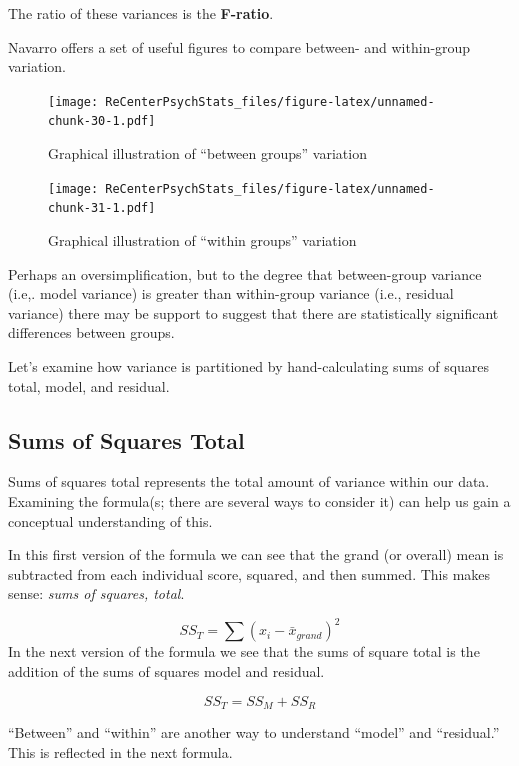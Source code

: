 \documentclass[
  english,
]{book}
\begin{document}
The ratio of these variances is the \textbf{F-ratio}.

Navarro \citeyearpar{navarro_book_2020} offers a set of useful figures to compare between- and within-group variation.

\begin{figure}
\centering
\texttt{[image: ReCenterPsychStats\_files/figure-latex/unnamed-chunk-30-1.pdf]}
\caption{\label{fig:unnamed-chunk-30}Graphical illustration of ``between groups'' variation}
\end{figure}

\begin{figure}
\centering
\texttt{[image: ReCenterPsychStats\_files/figure-latex/unnamed-chunk-31-1.pdf]}
\caption{\label{fig:unnamed-chunk-31}Graphical illustration of ``within groups'' variation}
\end{figure}

Perhaps an oversimplification, but to the degree that between-group variance (i.e,. model variance) is greater than within-group variance (i.e., residual variance) there may be support to suggest that there are statistically significant differences between groups.

Let's examine how variance is partitioned by hand-calculating sums of squares total, model, and residual.

\hypertarget{sums-of-squares-total}{%
\subsection{Sums of Squares Total}\label{sums-of-squares-total}}

Sums of squares total represents the total amount of variance within our data. Examining the formula(s; there are several ways to consider it) can help us gain a conceptual understanding of this.

In this first version of the formula we can see that the grand (or overall) mean is subtracted from each individual score, squared, and then summed. This makes sense: \emph{sums of squares, total}.

\[SS_{T}= \sum (x_{i}-\bar{x}_{grand})^{2}\]
In the next version of the formula we see that the sums of square total is the addition of the sums of squares model and residual.

\[SS_{T}= SS_{M} + SS_{R}\]

``Between'' and ``within'' are another way to understand ``model'' and ``residual.'' This is reflected in the next formula.
\end{document}
